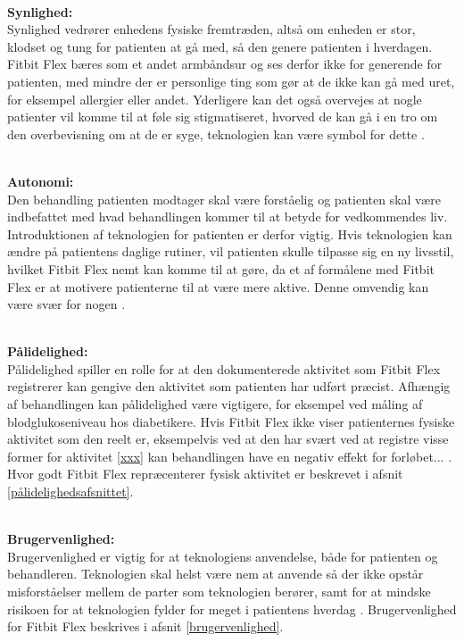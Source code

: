 \noindent \\
\textbf{Synlighed:}
\noindent \\
Synlighed vedrører enhedens fysiske fremtræden, altså om enheden er stor, klodset og tung for patienten at gå med, så den  genere patienten i hverdagen. Fitbit Flex bæres som et andet armbåndsur og ses derfor ikke for generende for patienten, med mindre der er personlige ting som gør at de ikke kan gå med uret, for eksempel allergier eller andet. Yderligere kan det også overvejes at nogle patienter vil komme til at føle sig stigmatiseret, hvorved de kan gå i en tro om den overbevisning om at de er syge, teknologien kan være symbol for dette \citep{Mittelstand2011}. 

\noindent \\
\textbf{Autonomi:}
\noindent \\
Den behandling patienten modtager skal være forståelig og patienten skal være indbefattet med hvad behandlingen kommer til at betyde for vedkommendes liv. Introduktionen af teknologien for patienten er derfor vigtig. Hvis teknologien kan ændre på patientens daglige rutiner, vil patienten skulle tilpasse sig en ny livsstil, hvilket Fitbit Flex nemt kan komme til at gøre, da et af formålene med Fitbit Flex er at motivere patienterne til at være mere aktive. Denne omvendig kan være svær for nogen \citep{Mittelstand2011}. %

\noindent \\
\textbf{Pålidelighed:}
\noindent \\
Pålidelighed spiller en rolle for at den dokumenterede aktivitet som Fitbit Flex registrerer kan gengive den aktivitet som patienten har udført præcist. Afhængig af behandlingen kan pålidelighed være vigtigere, for eksempel ved måling af blodglukoseniveau hos diabetikere. Hvis Fitbit Flex ikke viser patienternes fysiske aktivitet som den reelt er, eksempelvis ved at den har svært ved at registre visse former for aktivitet \autoref{xxx} kan behandlingen have en negativ effekt for forløbet... \citep{Nordgren2013}. Hvor godt Fitbit Flex repræcenterer fysisk aktivitet er beskrevet i afsnit \autoref{pålidelighedsafsnittet}.

\noindent \\
\textbf{Brugervenlighed:}
\noindent \\
Brugervenlighed er vigtig for at teknologiens anvendelse, både for patienten og behandleren. Teknologien skal helst være nem at anvende så der ikke opstår misforståelser mellem de parter som teknologien berører, samt for at mindske risikoen for at teknologien fylder for meget i patientens hverdag  \citep{Nordgren2013}. Brugervenlighed for Fitbit Flex beskrives i afsnit \autoref{brugervenlighed}.
 
